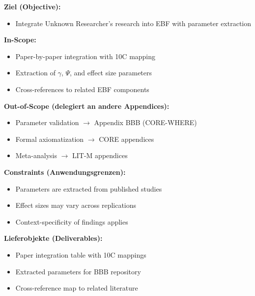 
\begin{tcolorbox}[
    colback=orange!5!white,
    colframe=orange!75!black,
    title={\textbf{Appendix Scope: Ziel / In-Scope / Out-of-Scope / Constraints}},
    fonttitle=\bfseries
]

\textbf{Ziel (Objective):}
\begin{itemize}[nosep]
    \item Integrate Unknown Researcher's research into EBF with parameter extraction
\end{itemize}

\textbf{In-Scope:}
\begin{itemize}[nosep]
    \item Paper-by-paper integration with 10C mapping
    \item Extraction of $\gamma$, $\Psi$, and effect size parameters
    \item Cross-references to related EBF components
\end{itemize}

\textbf{Out-of-Scope (delegiert an andere Appendices):}
\begin{itemize}[nosep]
    \item Parameter validation $\rightarrow$ Appendix BBB (CORE-WHERE)
    \item Formal axiomatization $\rightarrow$ CORE appendices
    \item Meta-analysis $\rightarrow$ LIT-M appendices
\end{itemize}

\textbf{Constraints (Anwendungsgrenzen):}
\begin{itemize}[nosep]
    \item Parameters are extracted from published studies
    \item Effect sizes may vary across replications
    \item Context-specificity of findings applies
\end{itemize}

\textbf{Lieferobjekte (Deliverables):}
\begin{itemize}[nosep]
    \item Paper integration table with 10C mappings
    \item Extracted parameters for BBB repository
    \item Cross-reference map to related literature
\end{itemize}

\end{tcolorbox}


